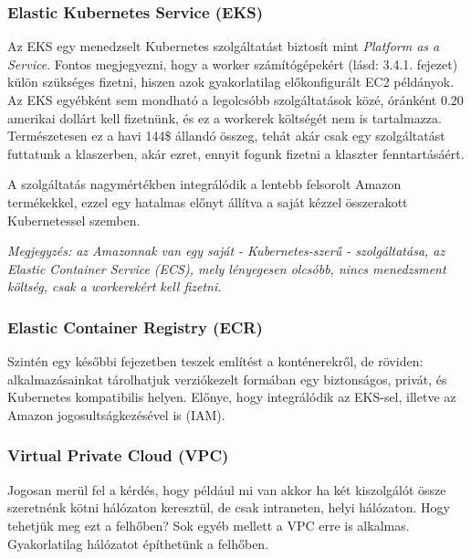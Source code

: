\subsubsection{Elastic Kubernetes Service (EKS)}
Az EKS egy menedzselt Kubernetes szolgáltatást biztosít mint \textit{Platform as a Service}. Fontos megjegyezni, hogy a worker számítógépekért (lásd: 3.4.1. fejezet) külön szükséges fizetni, hiszen azok gyakorlatilag előkonfigurált EC2 példányok. Az EKS egyébként sem mondható a legolcsóbb szolgáltatások közé, óránként 0.20 amerikai dollárt kell fizetnünk, és ez a workerek költségét nem is tartalmazza. Természetesen ez a havi 144\$ állandó összeg, tehát akár csak egy szolgáltatást futtatunk a klaszerben, akár ezret, ennyit fogunk fizetni a klaszter fenntartásáért.

A szolgáltatás nagymértékben integrálódik a lentebb felsorolt Amazon termékekkel, ezzel egy hatalmas előnyt állítva a saját kézzel összerakott Kubernetessel szemben.

\textit{Megjegyzés: az Amazonnak van egy saját - Kubernetes-szerű - szolgáltatása, az Elastic Container Service (ECS), mely lényegesen olcsóbb, nincs menedzsment költség, csak a workerekért kell fizetni.}
\subsubsection{Elastic Container Registry (ECR)}
Szintén egy későbbi fejezetben teszek említést a konténerekről, de röviden: alkalmazásainkat tárolhatjuk verziókezelt formában egy biztonságos, privát, és Kubernetes kompatibilis helyen. Előnye, hogy integrálódik az EKS-sel, illetve az Amazon jogosultságkezésével is (IAM).
\subsubsection{Virtual Private Cloud (VPC)}
Jogosan merül fel a kérdés, hogy például mi van akkor ha két kiszolgálót össze szeretnénk kötni hálózaton keresztül, de csak intraneten, helyi hálózaton. Hogy tehetjük meg ezt a felhőben? Sok egyéb mellett a VPC erre is alkalmas. Gyakorlatilag hálózatot építhetünk a felhőben.

